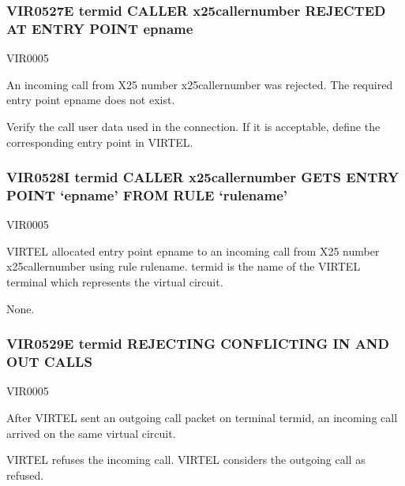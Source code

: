 \documentclass[letterpaper,10pt,english]{sphinxmanual}
\begin{document}
\subsubsection{VIR0527E termid CALLER x25callernumber REJECTED AT ENTRY POINT epname}
\label{\detokenize{messages:vir0527e-termid-caller-x25callernumber-rejected-at-entry-point-epname}}\begin{description}
\sphinxAtStartPar
VIR0005

\sphinxAtStartPar
An incoming call from X25 number x25callernumber was rejected. The required entry point epname does not exist.

\sphinxAtStartPar
Verify the call user data used in the connection. If it is acceptable, define the corresponding entry point in VIRTEL.

\end{description}


\subsubsection{VIR0528I termid CALLER x25callernumber GETS ENTRY POINT ‘epname’ FROM RULE ‘rulename’}
\label{\detokenize{messages:vir0528i-termid-caller-x25callernumber-gets-entry-point-epname-from-rule-rulename}}\begin{description}
\sphinxAtStartPar
VIR0005

\sphinxAtStartPar
VIRTEL allocated entry point epname to an incoming call from X25 number x25callernumber using rule rulename. termid is the name of the VIRTEL terminal which represents the virtual circuit.

\sphinxAtStartPar
None.

\end{description}


\subsubsection{VIR0529E termid REJECTING CONFLICTING IN AND OUT CALLS}
\label{\detokenize{messages:vir0529e-termid-rejecting-conflicting-in-and-out-calls}}\begin{description}
\sphinxAtStartPar
VIR0005

\sphinxAtStartPar
After VIRTEL sent an outgoing call packet on terminal termid, an incoming call arrived on the same virtual circuit.

\sphinxAtStartPar
VIRTEL refuses the incoming call. VIRTEL considers the outgoing call as refused.

\end{description}
\end{document}
